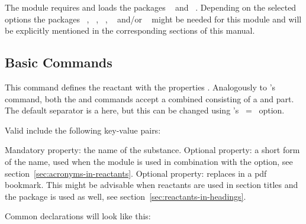 \documentclass{chemmacros-manual}
\begin{document}
The module requires and loads the packages ~\cite{pkg:chemnum} and
~\cite{pkg:siunitx}. Depending on the selected options the packages 
~\cite{pkg:acro}, ~\cite{pkg:glossaries-extra}, 
~\cite{pkg:hyperref}, ~\cite{pkg:longtable} and/or 
~\cite{pkg:xltabular} might be needed for this module and will be explicitly 
mentioned in the corresponding sections of this manual.

\subsection{Basic Commands}

\begin{commands}
    This command defines the reactant  with the properties
    .
    Analogously to 's  command, both the  and
     commands accept a combined  consisting of a
     and  part. The default separator is a  here, 
    but this can be changed using 's ~=~ option.
\end{commands}
Valid  include the following key-value pairs:
\begin{options}
    Mandatory property: the name of the substance.
    Optional property: a short form of the name, used when the  module is 
    used in combination with the  option, see 
    section~\vref{sec:acronyms-in-reactants}.
    Optional property: replaces  in a \ac{pdf} bookmark.  This might be advisable 
    when reactants are used in section titles and the  package is used as
    well, see section~\vref{sec:reactants-in-headings}.
\end{options}

Common declarations will look like this:
\begin{sourcecode}
\end{sourcecode}
\end{document}
